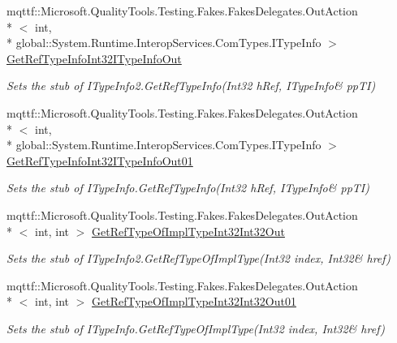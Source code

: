 \begin{DoxyCompactItemize}
mqttf\-::\-Microsoft.\-Quality\-Tools.\-Testing.\-Fakes.\-Fakes\-Delegates.\-Out\-Action\\*
$<$ int, \\*
global\-::\-System.\-Runtime.\-Interop\-Services.\-Com\-Types.\-I\-Type\-Info $>$ \hyperlink{class_system_1_1_runtime_1_1_interop_services_1_1_com_types_1_1_fakes_1_1_stub_i_type_info2_ac1129ea2a85b5b93eb192ecfb9097a8b}{Get\-Ref\-Type\-Info\-Int32\-I\-Type\-Info\-Out}
\begin{DoxyCompactList}\small\item\em Sets the stub of I\-Type\-Info2.\-Get\-Ref\-Type\-Info(Int32 h\-Ref, I\-Type\-Info\& pp\-T\-I)\end{DoxyCompactList}\item 
mqttf\-::\-Microsoft.\-Quality\-Tools.\-Testing.\-Fakes.\-Fakes\-Delegates.\-Out\-Action\\*
$<$ int, \\*
global\-::\-System.\-Runtime.\-Interop\-Services.\-Com\-Types.\-I\-Type\-Info $>$ \hyperlink{class_system_1_1_runtime_1_1_interop_services_1_1_com_types_1_1_fakes_1_1_stub_i_type_info2_a1549e1b78f498dbeffb16dd7bf86106d}{Get\-Ref\-Type\-Info\-Int32\-I\-Type\-Info\-Out01}
\begin{DoxyCompactList}\small\item\em Sets the stub of I\-Type\-Info.\-Get\-Ref\-Type\-Info(Int32 h\-Ref, I\-Type\-Info\& pp\-T\-I)\end{DoxyCompactList}\item 
mqttf\-::\-Microsoft.\-Quality\-Tools.\-Testing.\-Fakes.\-Fakes\-Delegates.\-Out\-Action\\*
$<$ int, int $>$ \hyperlink{class_system_1_1_runtime_1_1_interop_services_1_1_com_types_1_1_fakes_1_1_stub_i_type_info2_a6c7bc25245eb4471a27b15376f6b388e}{Get\-Ref\-Type\-Of\-Impl\-Type\-Int32\-Int32\-Out}
\begin{DoxyCompactList}\small\item\em Sets the stub of I\-Type\-Info2.\-Get\-Ref\-Type\-Of\-Impl\-Type(Int32 index, Int32\& href)\end{DoxyCompactList}\item 
mqttf\-::\-Microsoft.\-Quality\-Tools.\-Testing.\-Fakes.\-Fakes\-Delegates.\-Out\-Action\\*
$<$ int, int $>$ \hyperlink{class_system_1_1_runtime_1_1_interop_services_1_1_com_types_1_1_fakes_1_1_stub_i_type_info2_a4e57b1ba6e205ccb44a10b85dee9b002}{Get\-Ref\-Type\-Of\-Impl\-Type\-Int32\-Int32\-Out01}
\begin{DoxyCompactList}\small\item\em Sets the stub of I\-Type\-Info.\-Get\-Ref\-Type\-Of\-Impl\-Type(Int32 index, Int32\& href)\end{DoxyCompactList}\item 

\end{DoxyCompactItemize}
